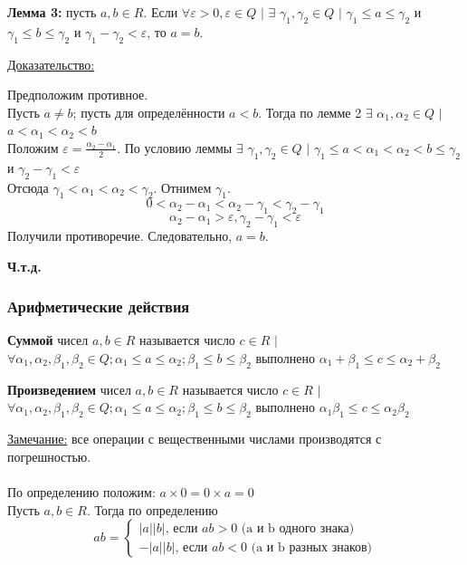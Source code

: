 \documentclass[12pt]{article}
\begin{document}
    \textbf{Лемма 3:} пусть $a,b \in R$. Если $\forall \varepsilon > 0, \varepsilon \in Q$ $|$ $\exists$ $\gamma_{1}, \gamma_{2} \in Q$ $|$ $\gamma_{1} \le a \le \gamma_{2}$ и $\gamma_{1} \le b \le \gamma_{2}$ и $\gamma_{1} - \gamma_{2} < \varepsilon$, то $a = b$.\par\noindent
    \underline{Доказательство:} 
    \begin{adjustwidth}{1.5em}{1.5em}
        Предположим противное.\\
        Пусть $a \ne b$; пусть для определённости $a < b$. Тогда по лемме 2 $\exists$ $\alpha_{1}, \alpha_{2} \in Q$ $|$ $a < \alpha_{1} < \alpha_{2} < b$\\
        Положим $\varepsilon = \frac{\alpha_{2}-\alpha_{1}}{2}$. По условию леммы $\exists$ $\gamma_{1}, \gamma_{2} \in Q$ $|$ $\gamma_{1} \le a < \alpha_{1} < \alpha_{2} < b \le \gamma_{2}$ и $\gamma_{2} - \gamma_{1} < \varepsilon$\\
        Отсюда $\gamma_{1} < \alpha_{1} < \alpha_{2} < \gamma_{2}$. Отнимем $\gamma_{1}$.\\
        \[0 < \alpha_{2} - \alpha_{1} < \alpha_{2}-\gamma_{1} < \gamma_{2}-\gamma_{1}\]
        \[\alpha_{2} - \alpha_{1} > \varepsilon, \gamma_{2} - \gamma_{1} < \varepsilon\]
        Получили противоречие. Следовательно, $a = b$.
        \begin{center}
            \textbf{Ч.т.д.}
        \end{center}
    \end{adjustwidth}

    \subsubsection*{Арифметические действия}
    \noindent \textbf{Суммой} чисел $a,b \in R$ называется число $c \in R$ $|$ $\forall \alpha_{1}, \alpha_{2}, \beta_{1}, \beta_{2} \in Q; \alpha_{1} \le a \le \alpha_{2}; \beta_{1} \le b \le \beta_{2}$ выполнено $\alpha_{1} + \beta_{1} \le c \le \alpha_{2} + \beta_{2}$\par\noindent
    \noindent \textbf{Произведением} чисел $a,b \in R$ называется число $c \in R$ $|$ $\forall \alpha_{1}, \alpha_{2}, \beta_{1}, \beta_{2} \in Q; \alpha_{1} \le a \le \alpha_{2}; \beta_{1} \le b \le \beta_{2}$ выполнено $\alpha_{1}\beta_{1}\le c \le \alpha_{2}\beta_{2}$\par\noindent
    \underline{Замечание:} все операции с вещественными числами производятся с погрешностью.\\\\
    По определению положим: $a \times 0 = 0 \times a = 0$\\
    Пусть $a,b \in R$. Тогда по определению
    \[ab = \begin{cases}
        |a||b|\text{, если }ab > 0\text{ (a и b одного знака)}\\
        -|a||b|\text{, если }ab < 0\text{ (a и b разных знаков)}
    \end{cases}\]
\end{document}
